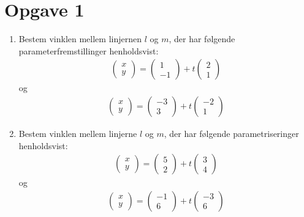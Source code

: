 \section*{Opgave 1}
\begin{enumerate}[label=\roman*)]

\item Bestem vinklen mellem linjernen $l$ og $m$, der har følgende parameterfremstillinger henholdsvist:
\begin{align*}
\begin{pmatrix}
x \\ y
\end{pmatrix}
= 
\begin{pmatrix}
1 \\ -1
\end{pmatrix}
+
t
\begin{pmatrix}
2 \\ 1
\end{pmatrix}
\end{align*}
og 
\begin{align*}
\begin{pmatrix}
x \\ y
\end{pmatrix}
= 
\begin{pmatrix}
-3 \\ 3
\end{pmatrix}
+
t
\begin{pmatrix}
-2 \\ 1
\end{pmatrix}
\end{align*}

\item Bestem vinklen mellem linjerne $l$ og $m$, der har følgende parametriseringer henholdsvist:
\begin{align*}
\begin{pmatrix}
x \\ y
\end{pmatrix}
= 
\begin{pmatrix}
5 \\ 2
\end{pmatrix}
+
t
\begin{pmatrix}
3 \\ 4
\end{pmatrix}
\end{align*}
og 
\begin{align*}
\begin{pmatrix}
x \\ y
\end{pmatrix}
= 
\begin{pmatrix}
-1 \\ 6
\end{pmatrix}
+
t
\begin{pmatrix}
-3 \\ 6
\end{pmatrix}
\end{align*}
\end{enumerate}




